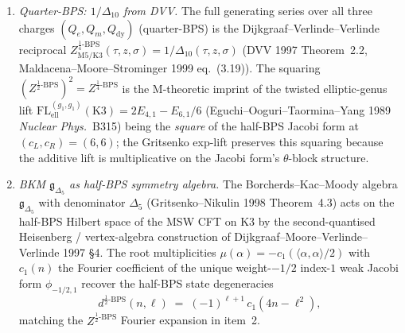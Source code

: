 \begin{proposition}
\begin{enumerate}
The generating function over M5-charge quantum numbers
$(Q_e,Q_m)$ with $Q_{\mathrm{dy}}=0$ (half-BPS locus) equals the
formal square-root of the Igusa cusp form
\[
 Z^{\tfrac12\text{-BPS}}_{\mathrm{M5}/\mathrm{K3}}(\tau,z,\sigma)
 \;=\; \frac{1}{\Delta_{10}(\tau,z,\sigma)^{1/2}}
 \;=\; \frac{1}{\Delta_5(\tau,z,\sigma)},
\]
where $\Delta_5$ is the Gritsenko--Nikulin paramodular cusp form of
weight $5$ (Gritsenko--Nikulin 1998, \emph{Amer.\ J.\ Math.}~119,
Theorem~3.1) and $\Delta_{10}=\Delta_5^2$ in Maass's square-root
convention. The formal square-root is well-defined as a formal
$q,y,p$-series because $\Delta_{10}$ has leading Fourier coefficient
$qyp\cdot 1$ (the Weyl vector) with unit leading term, so
$\Delta_{10}^{1/2}$ extracts as a Siegel modular form in the
paramodular extension $\Gamma^{\mathrm{para}}_1\subset
\mathrm{Sp}_4(\mathbb Z)$.
\item \emph{Quarter-BPS: $1/\Delta_{10}$ from DVV.}
The full generating series over all three charges
$(Q_e,Q_m,Q_{\mathrm{dy}})$ (quarter-BPS) is the
Dijkgraaf--Verlinde--Verlinde reciprocal
$Z^{\tfrac14\text{-BPS}}_{\mathrm{M5}/\mathrm{K3}}(\tau,z,\sigma) =
1/\Delta_{10}(\tau,z,\sigma)$
(DVV 1997 Theorem~2.2, Maldacena--Moore--Strominger 1999 eq.~(3.19)).
The squaring
$(Z^{\tfrac12\text{-BPS}})^2 = Z^{\tfrac14\text{-BPS}}$
is the M-theoretic imprint of the twisted elliptic-genus lift
$\mathrm{FL}^{(g_1,g_1)}_{\mathrm{ell}}(\mathrm K3)=2E_{4,1}-E_{6,1}/6$
(Eguchi--Ooguri--Taormina--Yang 1989 \emph{Nuclear Phys.}~B315) being
the \emph{square} of the half-BPS Jacobi form at $(c_L,c_R)=(6,6)$;
the Gritsenko exp-lift preserves this squaring because the additive
lift is multiplicative on the Jacobi form's $\theta$-block structure.
\item \emph{BKM $\mathfrak g_{\Delta_5}$ as half-BPS symmetry algebra.}
The Borcherds--Kac--Moody algebra $\mathfrak g_{\Delta_5}$ with
denominator $\Delta_5$ (Gritsenko--Nikulin 1998 Theorem~4.3) acts on
the half-BPS Hilbert space of the MSW CFT on K3 by the
second-quantised Heisenberg / vertex-algebra construction of
Dijkgraaf--Moore--Verlinde--Verlinde 1997 \S 4. The root multiplicities
$\mu(\alpha) = -c_1(\langle\alpha,\alpha\rangle/2)$ with $c_1(n)$
the Fourier coefficient of the unique weight-$-1/2$ index-$1$ weak
Jacobi form $\phi_{-1/2,1}$ recover the half-BPS state degeneracies
\[
 d^{\tfrac12\text{-BPS}}(n,\ell)
 \;=\; (-1)^{\ell+1}\,c_1(4n-\ell^2),
\]
matching the $Z^{\tfrac12\text{-BPS}}$ Fourier expansion in
item~2.
\end{enumerate}
\end{proposition}

